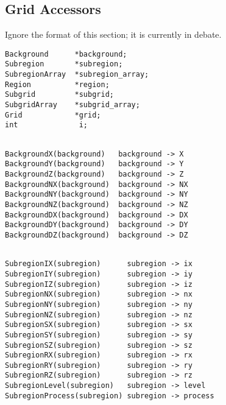 
\subsection{Grid Accessors}
\label{Grid Accessors}

Ignore the format of this section; it is currently in debate.

\begin{display}\begin{verbatim}
Background      *background;
Subregion       *subregion;
SubregionArray  *subregion_array;
Region          *region;
Subgrid         *subgrid;
SubgridArray    *subgrid_array;
Grid            *grid;
int              i;
\end{verbatim}\end{display}

\begin{display}\begin{verbatim}

BackgroundX(background)   background -> X
BackgroundY(background)   background -> Y
BackgroundZ(background)   background -> Z
BackgroundNX(background)  background -> NX
BackgroundNY(background)  background -> NY
BackgroundNZ(background)  background -> NZ
BackgroundDX(background)  background -> DX
BackgroundDY(background)  background -> DY
BackgroundDZ(background)  background -> DZ

\end{verbatim}\end{display}

\begin{display}\begin{verbatim}

SubregionIX(subregion)      subregion -> ix
SubregionIY(subregion)      subregion -> iy
SubregionIZ(subregion)      subregion -> iz
SubregionNX(subregion)      subregion -> nx
SubregionNY(subregion)      subregion -> ny
SubregionNZ(subregion)      subregion -> nz
SubregionSX(subregion)      subregion -> sx
SubregionSY(subregion)      subregion -> sy
SubregionSZ(subregion)      subregion -> sz
SubregionRX(subregion)      subregion -> rx
SubregionRY(subregion)      subregion -> ry
SubregionRZ(subregion)      subregion -> rz
SubregionLevel(subregion)   subregion -> level
SubregionProcess(subregion) subregion -> process

\end{verbatim}\end{display}

